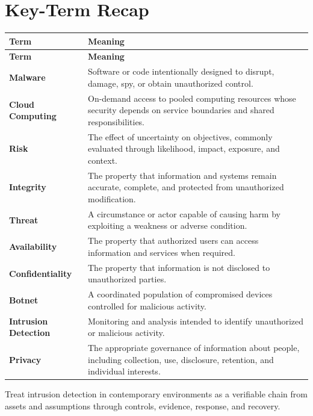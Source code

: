 \documentclass[11pt]{article}
\begin{document}
\section*{Key-Term Recap}
\begin{longtable}{>{\RaggedRight\arraybackslash}p{}>{\RaggedRight\arraybackslash}p{}}
\toprule\rowcolor{Navy}\color{white}\textbf{Term} & \color{white}\textbf{Meaning}\\\midrule
\endfirsthead
\toprule\rowcolor{Navy}\color{white}\textbf{Term} & \color{white}\textbf{Meaning}\\\midrule
\endhead
\textbf{Malware} & Software or code intentionally designed to disrupt, damage, spy, or obtain unauthorized control. \\\midrule
\textbf{Cloud Computing} & On-demand access to pooled computing resources whose security depends on service boundaries and shared responsibilities. \\\midrule
\textbf{Risk} & The effect of uncertainty on objectives, commonly evaluated through likelihood, impact, exposure, and context. \\\midrule
\textbf{Integrity} & The property that information and systems remain accurate, complete, and protected from unauthorized modification. \\\midrule
\textbf{Threat} & A circumstance or actor capable of causing harm by exploiting a weakness or adverse condition. \\\midrule
\textbf{Availability} & The property that authorized users can access information and services when required. \\\midrule
\textbf{Confidentiality} & The property that information is not disclosed to unauthorized parties. \\\midrule
\textbf{Botnet} & A coordinated population of compromised devices controlled for malicious activity. \\\midrule
\textbf{Intrusion Detection} & Monitoring and analysis intended to identify unauthorized or malicious activity. \\\midrule
\textbf{Privacy} & The appropriate governance of information about people, including collection, use, disclosure, retention, and individual interests. \\\midrule
\bottomrule
\end{longtable}
\begin{takeawaybox}
Treat intrusion detection in contemporary environments as a verifiable chain from assets and assumptions through controls, evidence, response, and recovery.
\end{takeawaybox}
\end{document}
